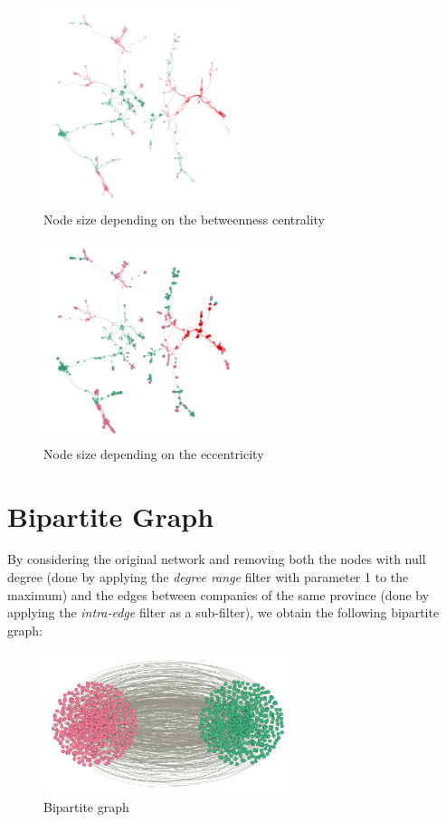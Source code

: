 \documentclass{article}
\begin{document}
    \begin{figure}[H]
        \centering
        \includegraphics[width=0.52\textwidth]{4.4.png}
        \caption{Node size depending on the betweenness centrality}
        \label{fig:figure-4.4}
    \end{figure}
    \begin{figure}[H]
        \centering
        \includegraphics[width=0.52\textwidth]{4.5.png}
        \caption{Node size depending on the eccentricity}
        \label{fig:figure-4.5}
    \end{figure}

\section{Bipartite Graph}
    By considering the original network and removing both the nodes with null degree (done by applying the \textit{degree range} filter with parameter 1 to the maximum) and the edges between companies of the same province (done by applying the \textit{intra-edge} filter as a sub-filter), we obtain the following bipartite graph:

    \begin{figure}[H]
        \centering
        \includegraphics[width=0.65\textwidth]{5.1.png}
        \caption{Bipartite graph}
        \label{fig:figure-5.1}
    \end{figure}
\end{document}
